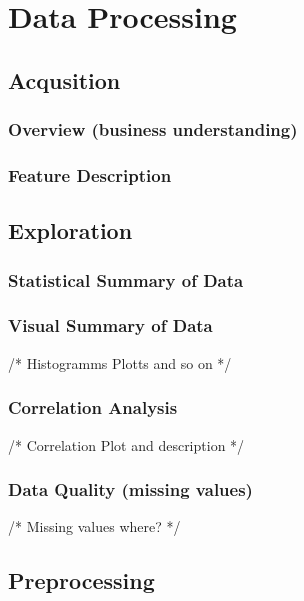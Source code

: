 \chapter{Data Processing}



\section{Acqusition}


\subsection{Overview (business understanding)}



\subsection{Feature Description}



\section{Exploration}



\subsection{Statistical Summary of Data}



\subsection{Visual Summary of Data} /* Histogramms Plotts and so on */




\subsection{Correlation Analysis} /* Correlation Plot and description */


\subsection{Data Quality (missing values)} /* Missing values where? */




\section{Preprocessing}
